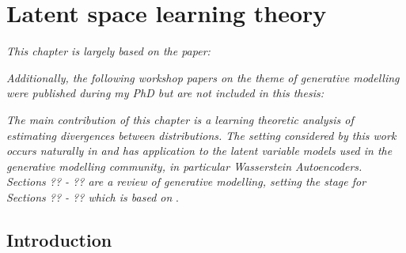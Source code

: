 \chapter{Latent space learning theory} %

\ifpdf
    \graphicspath{{Chapter5/Figs/Raster/}{Chapter5/Figs/PDF/}{Chapter5/Figs/}}
\else
    \graphicspath{{Chapter5/Figs/Vector/}{Chapter5/Figs/}}
\fi

\emph{This chapter is largely based on the paper:}

\begin{quote}
\end{quote}

\emph{Additionally, the following workshop papers on the theme of generative modelling were published during my PhD but are not included in this thesis:}

\begin{quote}
\end{quote}

\begin{quote}
\end{quote}

\emph{The main contribution of this chapter is a learning theoretic analysis of estimating divergences between distributions. 
The setting considered by this work occurs naturally in and has application to the latent variable models used in the generative modelling community, in particular Wasserstein Autoencoders.
Sections ?? - ?? are a review of generative modelling, setting the stage for Sections ?? - ?? which is based on} \cite{rubenstein2019practical}.


\section{Introduction}

